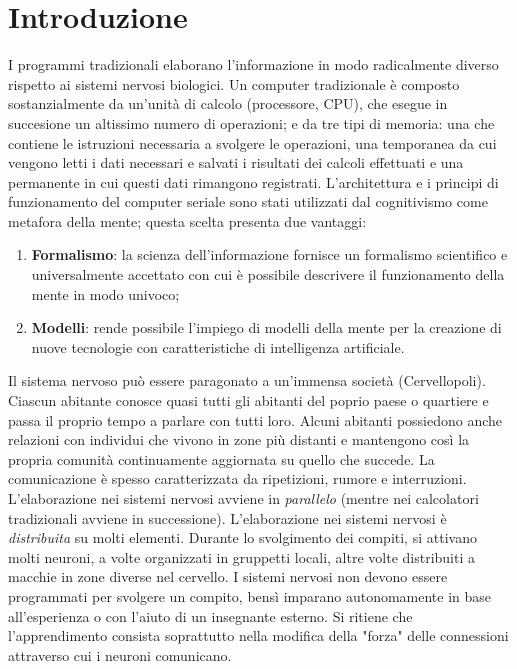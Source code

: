 \section{Introduzione}

I programmi tradizionali elaborano l'informazione in modo radicalmente diverso
rispetto ai sistemi nervosi biologici. Un computer tradizionale è composto
sostanzialmente da un'unità di calcolo (processore, CPU), che esegue in
succesione un altissimo numero di operazioni; e da tre tipi di memoria: una che
contiene le istruzioni necessaria a svolgere le operazioni, una temporanea da
cui vengono letti i dati necessari e salvati i risultati dei calcoli effettuati
e una permanente in cui questi dati rimangono registrati. L'architettura e i
principi di funzionamento del computer seriale sono stati utilizzati dal
cognitivismo come metafora della mente; questa scelta presenta due vantaggi:
\begin{enumerate}
	\item \textbf{Formalismo}: la scienza dell'informazione fornisce un
	      formalismo scientifico e universalmente accettato con cui è possibile
	      descrivere il funzionamento della mente in modo univoco;

	\item \textbf{Modelli}: rende possibile l'impiego di modelli della mente
	      per la creazione di nuove tecnologie con caratteristiche di
	      intelligenza artificiale.
\end{enumerate}

Il sistema nervoso può essere paragonato a un'immensa società (Cervellopoli).
Ciascun abitante conosce quasi tutti gli abitanti del poprio paese o quartiere e
passa il proprio tempo a parlare con tutti loro.
Alcuni abitanti possiedono anche relazioni con individui che vivono in zone più
distanti e mantengono così la propria comunità continuamente aggiornata su
quello che succede.
La comunicazione è spesso caratterizzata da ripetizioni, rumore e
interruzioni.\\
L'elaborazione nei sistemi nervosi avviene in \textit{parallelo} (mentre nei calcolatori
tradizionali avviene in successione).
L'elaborazione nei sistemi nervosi è \textit{distribuita} su molti elementi.
Durante lo svolgimento dei compiti, si attivano molti neuroni, a volte
organizzati in gruppetti locali, altre volte distribuiti a macchie in zone
diverse nel cervello.
I sistemi nervosi non devono essere programmati per svolgere un compito, bensì
imparano autonomamente in base all'esperienza o con l'aiuto di un insegnante
esterno. Si ritiene che l'apprendimento consista soprattutto nella modifica
della "forza" delle connessioni attraverso cui i neuroni comunicano.

